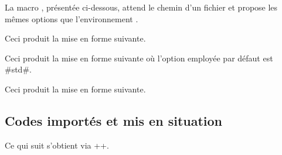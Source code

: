 \medskip


La macro , présentée ci-dessous, attend le chemin d'un fichier et propose les mêmes options que l'environnement .


\begin{tdocexa}
    \leavevmode

    \begin{tdoclatex}[code]

    \end{tdoclatex}

    Ceci produit la mise en forme suivante.


\end{tdocexa}


\begin{tdocexa}[À la suite]
    \leavevmode

    \begin{tdoclatex}[code]

    \end{tdoclatex}

    Ceci produit la mise en forme suivante où l'option employée par défaut est \tdocinlatex#std#.


\end{tdocexa}


\begin{tdocexa}
    \leavevmode

    \begin{tdoclatex}[code]

    \end{tdoclatex}

    Ceci produit la mise en forme suivante.


\end{tdocexa}



\subsection{Codes importés et mis en situation}
\label{tutodoc-latexshow}

\begin{tdocexa}
    Ce qui suit s'obtient via \tdocinlatex++.

    \medskip

    \begin{tdocshowcaseDOC}

    \end{tdocshowcaseDOC}
\end{tdocexa}


